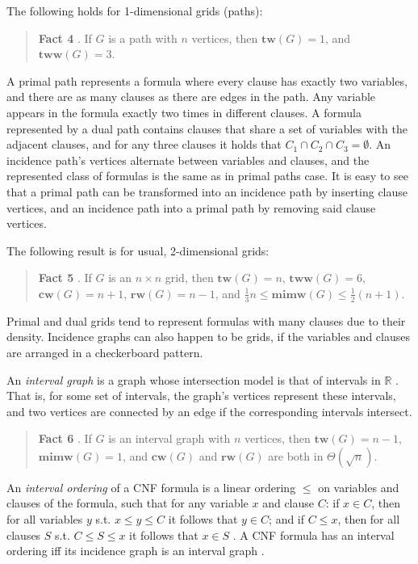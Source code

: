 \documentclass{article}
\begin{document}
The following holds for 1-dimensional grids (paths):
\begin{quote}
	\textbf{Fact 4} \cite{DBLP:conf/focs/Bonnet0TW20}.
	If $G$ is a path with $n$ vertices, then $\mathbf{tw}(G)=1$, and $\mathbf{tww}(G) = 3$.
\end{quote}

\noindent
A primal path represents a formula where every clause has exactly two variables, and there are as many clauses as there are edges in the path.
Any variable appears in the formula exactly two times in different clauses.
A formula represented by a dual path contains clauses that share a set of variables with the adjacent clauses, and for any three clauses it holds that $C_1 \cap C_2 \cap C_3 = \emptyset$.
An incidence path's vertices alternate between variables and clauses, and the represented class of formulas is the same as in primal paths case.
It is easy to see that a primal path can be transformed into an incidence path by inserting clause vertices, and an incidence path into a primal path by removing said clause vertices.

The following result is for usual, 2-dimensional grids:
\begin{quote}
	\textbf{Fact 5} \cite{DBLP:conf/focs/Bonnet0TW20, PHD:vatshelle}.
	If $G$ is an $n \times n$ grid, then $\mathbf{tw}(G) = n$, $\mathbf{tww}(G) = 6$, $\mathbf{cw}(G) = n + 1$, $\mathbf{rw}(G) = n - 1$, and $ \frac{1}{3}n \leq \mathbf{mimw}(G) \leq \frac{1}{2} (n+1)$.
\end{quote}

\noindent
Primal and dual grids tend to represent formulas with many clauses due to their density.
Incidence graphs can also happen to be grids, if the variables and clauses are arranged in a checkerboard pattern.

An {\em interval graph} is a graph whose intersection model is that of intervals in $\mathbb{R}$ \cite{DBLP:conf/sat/SaetherTV14}.
That is, for some set of intervals, the graph's vertices represent these intervals, and two vertices are connected by an edge if the corresponding intervals intersect.

\begin{quote}
	\textbf{Fact 6} \cite{PHD:vatshelle}.
	If $G$ is an interval graph with $n$ vertices, then $\mathbf{tw}(G) = n - 1$, $\mathbf{mimw}(G) = 1$, and $\mathbf{cw}(G)$ and $\mathbf{rw}(G)$ are both in $\Theta(\sqrt{n})$.
\end{quote}

\noindent
An {\em interval ordering} of a CNF formula is a linear ordering $\leq $ on variables and clauses of the formula, such that for any variable $x$ and clause $C$: if $x \in C$, then for all variables $y$ s.t. $x \leq y \leq C$ it follows that $y \in C$; and if $C \leq x$, then for all clauses $S$ s.t. $C \leq S \leq x$ it follows that $x \in S$ \cite{DBLP:conf/sat/SaetherTV14}.
A CNF formula has an interval ordering iff its incidence graph is an interval graph \cite{DBLP:conf/sat/SaetherTV14}.
\end{document}
